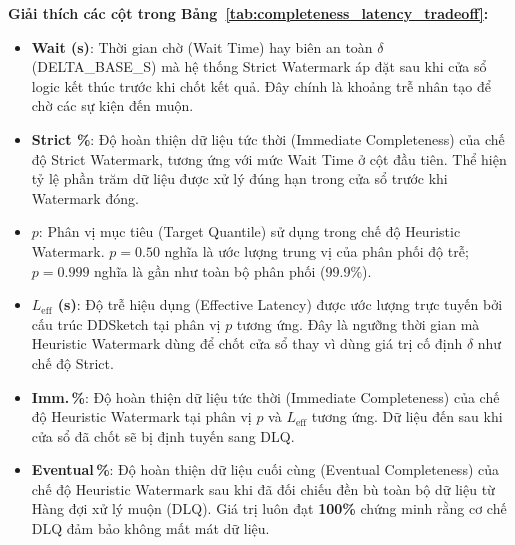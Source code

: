 \documentclass[12pt,a4paper]{article}
\begin{document}
\textbf{Giải thích các cột trong Bảng~\ref{tab:completeness_latency_tradeoff}:}
\begin{itemize}[leftmargin=*]
    \item \textbf{Wait (s)}: Thời gian chờ (Wait Time) hay biên an toàn $\delta$ (DELTA\_BASE\_S) mà hệ thống Strict Watermark áp đặt sau khi cửa sổ logic kết thúc trước khi chốt kết quả. Đây chính là khoảng trễ nhân tạo để chờ các sự kiện đến muộn.
    \item \textbf{Strict \%}: Độ hoàn thiện dữ liệu tức thời (Immediate Completeness) của chế độ Strict Watermark, tương ứng với mức Wait Time ở cột đầu tiên. Thể hiện tỷ lệ phần trăm dữ liệu được xử lý đúng hạn trong cửa sổ trước khi Watermark đóng.
    \item \textbf{$p$}: Phân vị mục tiêu (Target Quantile) sử dụng trong chế độ Heuristic Watermark. $p = 0.50$ nghĩa là ước lượng trung vị của phân phối độ trễ; $p = 0.999$ nghĩa là gần như toàn bộ phân phối (99.9\%).
    \item \textbf{$L_{\text{eff}}$ (s)}: Độ trễ hiệu dụng (Effective Latency) được ước lượng trực tuyến bởi cấu trúc DDSketch tại phân vị $p$ tương ứng. Đây là ngưỡng thời gian mà Heuristic Watermark dùng để chốt cửa sổ thay vì dùng giá trị cố định $\delta$ như chế độ Strict.
    \item \textbf{Imm.\,\%}: Độ hoàn thiện dữ liệu tức thời (Immediate Completeness) của chế độ Heuristic Watermark tại phân vị $p$ và $L_{\text{eff}}$ tương ứng. Dữ liệu đến sau khi cửa sổ đã chốt sẽ bị định tuyến sang DLQ.
    \item \textbf{Eventual\,\%}: Độ hoàn thiện dữ liệu cuối cùng (Eventual Completeness) của chế độ Heuristic Watermark sau khi đã đối chiếu đền bù toàn bộ dữ liệu từ Hàng đợi xử lý muộn (DLQ). Giá trị luôn đạt \textbf{100\%} chứng minh rằng cơ chế DLQ đảm bảo không mất mát dữ liệu.
\end{itemize}
\end{document}
